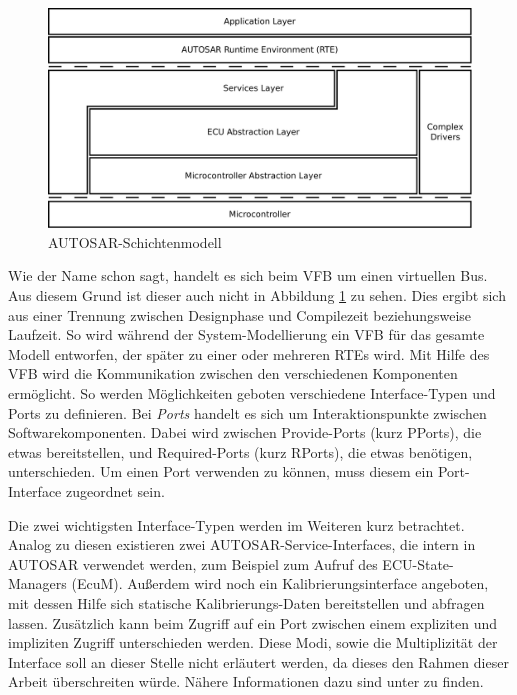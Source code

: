 \documentclass[
  a4paper,					    %
  twoside,
  DIV=calc,     				%
  bibliography=totoc,
  cleardoublepage=empty,
  ngerman,     					%
  final       					%
]{scrbook}
\begin{document}
\begin{figure}[ht]
    \centering
    \includegraphics[width=1\textwidth]{autosar_layer}
    \caption{AUTOSAR-Schichtenmodell}
    \label{fig:autosar_layer}
\end{figure}

Wie der Name schon sagt, handelt es sich beim VFB um einen virtuellen Bus. Aus diesem Grund ist dieser auch nicht in Abbildung \ref{fig:autosar_layer} zu sehen. Dies ergibt sich aus einer Trennung zwischen Designphase und Compilezeit beziehungsweise Laufzeit. So wird während der System-Modellierung ein VFB für das gesamte Modell entworfen, der später zu einer oder mehreren RTEs wird. Mit Hilfe des VFB wird die Kommunikation zwischen den verschiedenen Komponenten ermöglicht. So werden Möglichkeiten geboten verschiedene Interface-Typen und Ports zu definieren. Bei \emph{Ports} handelt es sich um Interaktionspunkte zwischen Softwarekomponenten. Dabei wird zwischen Provide-Ports (kurz PPorts), die etwas bereitstellen, und Required-Ports (kurz RPorts), die etwas benötigen, unterschieden. Um einen Port verwenden zu können, muss diesem ein Port-Interface zugeordnet sein.

Die zwei wichtigsten Interface-Typen werden im Weiteren kurz betrachtet. Analog zu diesen existieren zwei AUTOSAR-Service-Interfaces, die intern in AUTOSAR verwendet werden, zum Beispiel zum Aufruf des ECU-State-Managers (EcuM). Außerdem wird noch ein Kalibrierungsinterface angeboten, mit dessen Hilfe sich statische Kalibrierungs-Daten bereitstellen und abfragen lassen. Zusätzlich kann beim Zugriff auf ein Port zwischen einem expliziten und impliziten Zugriff unterschieden werden. Diese Modi, sowie die Multiplizität der Interface soll an dieser Stelle nicht erläutert werden, da dieses den Rahmen dieser Arbeit überschreiten würde. Nähere Informationen dazu sind unter \cite[Seite 101 ff.]{SE_Autosar} zu finden.
\end{document}
